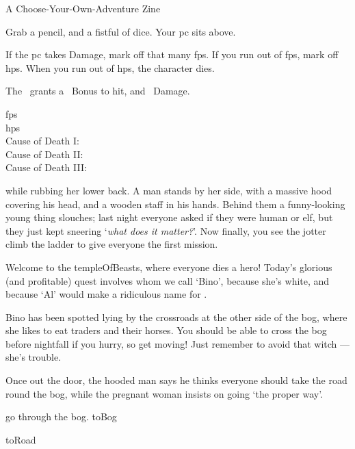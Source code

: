 \documentclass[10pt,twoside]{book}
\begin{document}
%
  {
    \vfill
    A Choose-Your-Own-Adventure Zine
  }

{
  \toggletrue{allyCharacter}
  \small
  \shortsword
  \noindent
  Grab a pencil, and a fistful of dice.
  Your \gls{pc} sits above.

  If the \gls{pc} takes Damage, mark off that many \glspl{fp}.
  If you run out of \glspl{fp}, mark off \glspl{hp}.
  When you run out of \glspl{hp}, the character dies.

  The \weaponName\ grants a ~Bonus to hit, and ~Damage.


  \begin{description}
    \item[\Glspl{fp}]
    \fpStat
    \item[\Glspl{hp}]
    \hpStat
    \item[Cause of Death I:]
    \bigLine
    \item[Cause of Death II:]
    \bigLine
    \item[Cause of Death III:]
    \bigLine
  \end{description}

}

\pagebreak
\pagestyle{minizine}

while rubbing her lower back.
A man stands by her side, with a massive hood covering his head, and a wooden staff in his hands.
Behind them a funny-looking young thing slouches; last night everyone asked if they were human or elf, but they just kept sneering `\textit{what does it matter?}'.
Now finally, you see the \gls{jotter} climb the ladder to give everyone the first mission.

\begin{speechtext}
  Welcome to the \gls{templeOfBeasts}, where everyone dies a hero!
  Today's glorious (and profitable) quest involves  whom we call `Bino', because she's white, and because `Al' would make a ridiculous name for .

  Bino has been spotted lying by the crossroads at the other side of the bog, where she likes to eat traders and their horses.
  You should be able to cross the bog before nightfall if you hurry, so get moving!
  Just remember to avoid that \gls{witch} --- she's trouble.
\end{speechtext}

Once out the door, the hooded man says he thinks everyone should take the road round the bog, while the pregnant woman insists on going `the proper way'.

\begin{selectPath}
  {go through the bog.}%
  {toBog}

  {}%
  {toRoad}
\end{selectPath}
\end{document}
